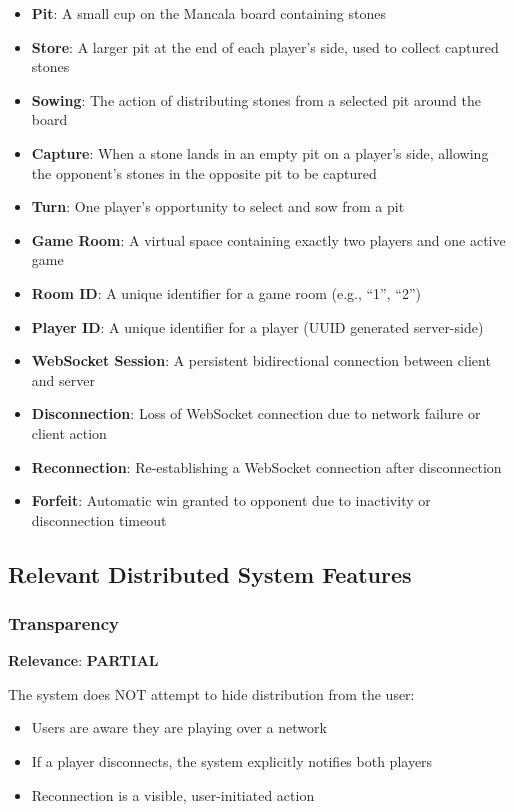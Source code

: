 \documentclass{scrartcl}
\begin{document}
\begin{itemize}
  \item \textbf{Pit}: A small cup on the Mancala board containing stones
  \item \textbf{Store}: A larger pit at the end of each player's side, used to collect captured stones
  \item \textbf{Sowing}: The action of distributing stones from a selected pit around the board
  \item \textbf{Capture}: When a stone lands in an empty pit on a player's side,
    allowing the opponent's stones in the opposite pit to be captured
  \item \textbf{Turn}: One player's opportunity to select and sow from a pit
  \item \textbf{Game Room}: A virtual space containing exactly two players and one active game
  \item \textbf{Room ID}: A unique identifier for a game room (e.g., ``1'', ``2'')
  \item \textbf{Player ID}: A unique identifier for a player (UUID generated server-side)
  \item \textbf{WebSocket Session}: A persistent bidirectional connection between client and server
  \item \textbf{Disconnection}: Loss of WebSocket connection due to network failure or client action
  \item \textbf{Reconnection}: Re-establishing a WebSocket connection after disconnection
  \item \textbf{Forfeit}: Automatic win granted to opponent due to inactivity or disconnection timeout
\end{itemize}

\subsection{Relevant Distributed System Features}\label{ds-features}

\subsubsection{Transparency}

\textbf{Relevance}: \textbf{PARTIAL}

The system does NOT attempt to hide distribution from the user:
\begin{itemize}
  \item Users are aware they are playing over a network
  \item If a player disconnects, the system explicitly notifies both players
  \item Reconnection is a visible, user-initiated action
\end{itemize}
\end{document}
